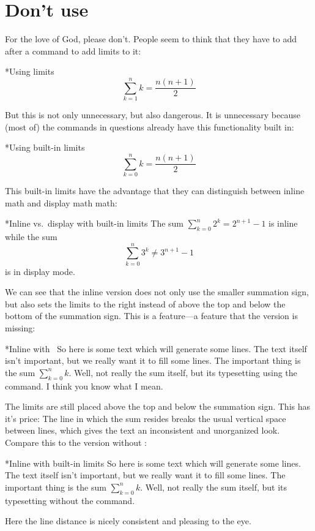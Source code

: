 \section{Don’t use }

For the love of God, please don’t.
People seem to think that they have to add  after a command to add limits to it:
\begin{showlatex}*{Using limits}
\[
  \sum\limits_{k=1}^n k
  =
  \frac{n(n+1)}{2}
\]
\end{showlatex}
But this is not only unnecessary, but also dangerous.
It is unnecessary because (most of) the commands in questions already have this functionality built in:
\begin{showlatex}*{Using built-in limits}
\[
  \sum_{k=0}^n k
  =
  \frac{n(n+1)}{2}
\]
\end{showlatex}
This built-in limits have the advantage that they can distinguish between inline math and display math math:
\begin{showlatex}*{Inline vs.\ display with built-in limits}
The sum $\sum_{k=0}^n 2^k = 2^{n+1} - 1$ is inline while the sum
\[
  \sum_{k=0}^n 3^k
  \neq
  3^{n+1} - 1
\]
is in display mode.
\end{showlatex}
We can see that the inline version does not only use the smaller summation sign, but also sets the limits to the right instead of above the top and below the bottom of the summation sign.
This is a feature---a feature that the  version is missing:
\begin{showlatex}*{Inline with~}
So here is some text which will generate some lines.
The text itself isn’t important, but we really want it to fill some lines.
The important thing is the sum $\sum\limits_{k=0}^n k$.
Well, not really the sum itself, but its typesetting using the  command.
I think you know what I mean.
\end{showlatex}
The limits are still placed above the top and below the summation sign.
This has it’s price:
The line in which the sum resides breaks the usual vertical space between lines, which gives the text an inconsistent and unorganized look.
Compare this to the version without :
\begin{showlatex}*{Inline with built-in limits}
So here is some text which will generate some lines.
The text itself isn’t important, but we really want it to fill some lines.
The important thing is the sum $\sum_{k=0}^n k$.
Well, not really the sum itself, but its typesetting without the  command.
\end{showlatex}
Here the line distance is nicely consistent and pleasing to the eye.

